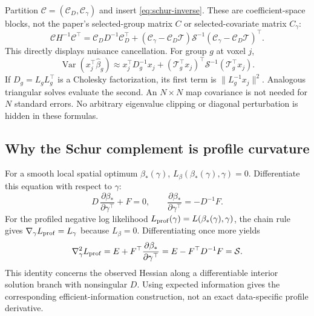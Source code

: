 \documentclass[11pt,a4paper]{article}
\newcommand{\Var}{\operatorname{Var}}
\numberwithin{equation}{section}
\begin{document}
Partition $\mathcal C=(\mathcal C_D,\mathcal C_\gamma)$ and insert
\eqref{eq:schur-inverse}. These are coefficient-space blocks, not
the paper's selected-group matrix $C$ or selected-covariate matrix
$C_\gamma$:
\begin{equation}
 \mathcal C H^{-1}\mathcal C^\top
 =\mathcal C_DD^{-1}\mathcal C_D^\top+
 (\mathcal C_\gamma-\mathcal C_D\mathcal T)\mathcal S^{-1}
 (\mathcal C_\gamma-\mathcal C_D\mathcal T)^\top .
 \label{eq:contrast-factor}
\end{equation}
This directly displays nuisance cancellation.
For group $g$ at voxel $j$,
\begin{equation}
 \Var(x_j^\top\widehat\beta_g)
 \approx x_j^\top D_g^{-1}x_j+
        (\mathcal T_g^\top x_j)^\top\mathcal S^{-1}(\mathcal T_g^\top x_j).
\end{equation}
If $D_g=L_gL_g^\top$ is a Cholesky factorization, its first term is
$\|L_g^{-1}x_j\|^2$. Analogous triangular solves evaluate the second.
An $N\times N$ map covariance is not needed for $N$ standard errors.
No arbitrary eigenvalue clipping or diagonal perturbation is hidden in
these formulas.

\subsection{Why the Schur complement is profile curvature}
For a smooth local spatial optimum $\beta_*(\gamma)$,
$L_\beta(\beta_*(\gamma),\gamma)=0$.
Differentiate this equation with respect to $\gamma$:
\[
 D\,\frac{\partial\beta_*}{\partial\gamma^\top}+F=0,
 \qquad \frac{\partial\beta_*}{\partial\gamma^\top}=-D^{-1}F.
\]
For the profiled negative log likelihood
$L_{\rm prof}(\gamma)=L(\beta_*(\gamma),\gamma)$, the chain rule gives
$\nabla_\gamma L_{\rm prof}=L_\gamma$ because $L_\beta=0$.
Differentiating once more yields
\[
 \nabla_\gamma^2 L_{\rm prof}
 =E+F^\top\frac{\partial\beta_*}{\partial\gamma^\top}
 =E-F^\top D^{-1}F=\mathcal S.
\]
This identity concerns the observed Hessian along a differentiable
interior solution branch with nonsingular $D$.
Using expected information gives the corresponding efficient-information
construction, not an exact data-specific profile derivative.
\end{document}
